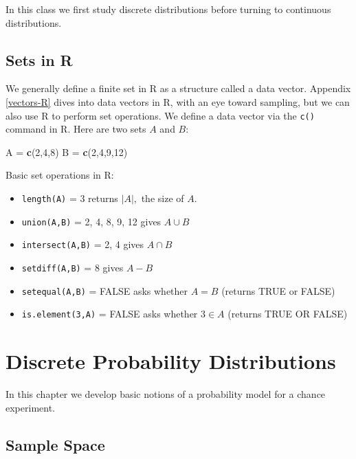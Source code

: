\documentclass[
]{book}
\newenvironment{Shaded}{\begin{snugshade}}{\end{snugshade}}
\newcommand{\DecValTok}[1]{\textcolor[rgb]{0.00,0.00,0.81}{#1}}
\newcommand{\FunctionTok}[1]{\textcolor[rgb]{0.13,0.29,0.53}{\textbf{#1}}}
\newcommand{\NormalTok}[1]{#1}
\newcommand{\OtherTok}[1]{\textcolor[rgb]{0.56,0.35,0.01}{#1}}
\providecommand{\tightlist}{%
  \setlength{\itemsep}{0pt}\setlength{\parskip}{0pt}}
\theoremstyle{definition}
\theoremstyle{definition}
\theoremstyle{definition}
\theoremstyle{definition}
\theoremstyle{remark}
\begin{document}
In this class we first study discrete distributions before turning to continuous distributions.

\section{Sets in R}\label{sets-in-r}

We generally define a finite set in R as a structure called a data vector. Appendix \ref{vectors-R} dives into data vectors in R, with an eye toward sampling, but we can also use R to perform set operations. We define a data vector via the \texttt{c()} command in R. Here are two sets \(A\) and \(B\):

\begin{Shaded}
\begin{Highlighting}[]
\NormalTok{A }\OtherTok{=} \FunctionTok{c}\NormalTok{(}\DecValTok{2}\NormalTok{,}\DecValTok{4}\NormalTok{,}\DecValTok{8}\NormalTok{)}
\NormalTok{B }\OtherTok{=} \FunctionTok{c}\NormalTok{(}\DecValTok{2}\NormalTok{,}\DecValTok{4}\NormalTok{,}\DecValTok{9}\NormalTok{,}\DecValTok{12}\NormalTok{)}
\end{Highlighting}
\end{Shaded}

Basic set operations in R:

\begin{itemize}
\tightlist
\item
  \texttt{length(A)} = 3 returns \(|A|,\) the size of \(A\).
\item
  \texttt{union(A,B)} = 2, 4, 8, 9, 12 gives \(A \cup B\)
\item
  \texttt{intersect(A,B)} = 2, 4 gives \(A \cap B\)
\item
  \texttt{setdiff(A,B)} = 8 gives \(A - B\)
\item
  \texttt{setequal(A,B)} = FALSE asks whether \(A = B\) (returns TRUE or FALSE)
\item
  \texttt{is.element(3,A)} = FALSE asks whether \(3 \in A\) (returns TRUE OR FALSE)
\end{itemize}

\chapter{Discrete Probability Distributions}\label{discrete-probability-distributions}

In this chapter we develop basic notions of a probability model for a chance experiment.

\section{Sample Space}\label{sample-space}
\end{document}
